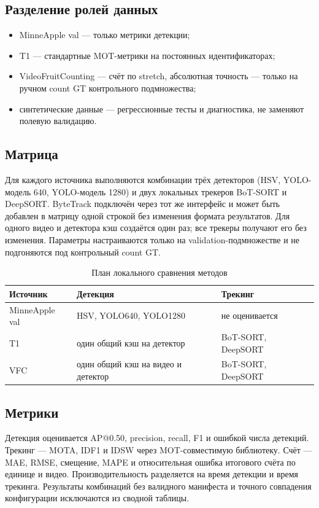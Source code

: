 \documentclass[12pt,a4paper]{article}
\begin{document}
\subsection{Разделение ролей данных}

\begin{itemize}
  \item MinneApple val --- только метрики детекции;
  \item T1 --- стандартные MOT-метрики на постоянных идентификаторах;
  \item VideoFruitCounting --- счёт по stretch, абсолютная точность ---
        только на ручном count GT контрольного подмножества;
  \item синтетические данные --- регрессионные тесты и диагностика, не
        заменяют полевую валидацию.
\end{itemize}

\subsection{Матрица}

Для каждого источника выполняются комбинации трёх детекторов (HSV,
YOLO-модель 640, YOLO-модель 1280) и двух локальных трекеров BoT-SORT и
DeepSORT. ByteTrack подключён через тот же интерфейс и может быть добавлен
в матрицу одной строкой без изменения формата результатов. Для одного видео
и детектора кэш создаётся один раз; все трекеры получают его без изменения.
Параметры настраиваются только на validation-подмножестве и не подгоняются
под контрольный count GT.

\begin{table}[htbp]
\centering
\caption{План локального сравнения методов}
\label{tab:plan}
\begin{tabular}{lll}
\hline
Источник & Детекция & Трекинг \\
\hline
MinneApple val & HSV, YOLO640, YOLO1280 & не оценивается \\
T1 & один общий кэш на детектор & BoT-SORT, DeepSORT \\
VFC & один общий кэш на видео и детектор & BoT-SORT, DeepSORT \\
\hline
\end{tabular}
\end{table}

\subsection{Метрики}

Детекция оценивается AP@0.50, precision, recall, F1 и ошибкой числа
детекций. Трекинг --- MOTA, IDF1 и IDSW через MOT-совместимую библиотеку.
Счёт --- MAE, RMSE, смещение, MAPE и относительная ошибка итогового счёта
по единице и видео. Производительность разделяется на время детекции и
время трекинга. Результаты комбинаций без валидного манифеста и точного
совпадения конфигурации исключаются из сводной таблицы.
\end{document}
